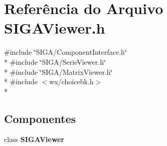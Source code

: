 \section{Referência do Arquivo S\+I\+G\+A\+Viewer.\+h}
\label{_s_i_g_a_viewer_8h}
{\ttfamily \#include \char`\"{}S\+I\+G\+A/\+Component\+Interface.\+h\char`\"{}}\\*
{\ttfamily \#include \char`\"{}S\+I\+G\+A/\+Serie\+Viewer.\+h\char`\"{}}\\*
{\ttfamily \#include \char`\"{}S\+I\+G\+A/\+Matrix\+Viewer.\+h\char`\"{}}\\*
{\ttfamily \#include $<$wx/choicebk.\+h$>$}\\*
\subsection*{Componentes}
\begin{DoxyCompactItemize}
\item 
class {\bf S\+I\+G\+A\+Viewer}
\end{DoxyCompactItemize}
